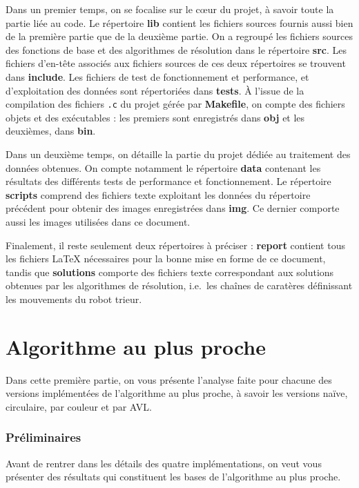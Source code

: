 \documentclass[12pt,a4paper]{article}
\begin{document}
Dans un premier temps, on se focalise sur le c\oe ur du projet, \`a 
savoir toute la partie li\'ee au code. Le r\'epertoire {\bfseries lib} contient 
les fichiers sources fournis aussi bien de la premi\`ere partie que de la 
deuxi\`eme partie. On a regroup\'e les fichiers sources des fonctions de base 
et des algorithmes de r\'esolution dans le r\'epertoire {\bfseries src}. Les 
fichiers d'en-t\^ete associ\'es aux fichiers sources de ces deux r\'epertoires 
se trouvent dans {\bfseries include}. Les fichiers de test de fonctionnement et 
performance, et d'exploitation des donn\'ees sont r\'epertori\'ees dans 
{\bfseries tests}. \`A l'issue de la compilation des fichiers \texttt{.c} du 
projet g\'er\'ee par {\bfseries Makefile}, on compte des fichiers objets et des 
ex\'ecutables : les premiers sont enregistr\'es dans {\bfseries obj} et les 
deuxi\`emes, dans {\bfseries bin}. 

Dans un deuxi\`eme temps, on d\'etaille la partie du projet d\'edi\'ee au 
traitement des donn\'ees obtenues. On compte notamment le r\'epertoire 
{\bfseries data} contenant les r\'esultats des diff\'erents tests de performance 
et fonctionnement. Le r\'epertoire {\bfseries scripts} comprend des fichiers 
texte exploitant les donn\'ees du r\'epertoire pr\'ec\'edent pour obtenir des 
images enregistr\'ees dans {\bfseries img}. Ce dernier comporte aussi les 
images utilis\'ees dans ce document.

Finalement, il reste seulement deux r\'epertoires \`a pr\'eciser : {\bfseries 
report} contient tous les fichiers \LaTeX{} n\'ecessaires pour la bonne mise en 
forme de ce document, tandis que {\bfseries solutions} comporte des fichiers 
texte correspondant aux solutions obtenues par les algorithmes de r\'esolution, 
i.e.\ les cha\^ines de carat\`eres d\'efinissant les mouvements du robot
 trieur.


\newpage

\part{Algorithme au plus proche}
Dans cette premi\`ere partie, on vous pr\'esente l'analyse faite pour chacune 
des versions impl\'ement\'ees de l'algorithme au plus proche, \`a savoir les 
versions na\"ive, circulaire, par couleur et par AVL.

\section{Pr\'eliminaires}
Avant de rentrer dans les d\'etails des quatre impl\'ementations, on 
veut vous pr\'esenter des r\'esultats qui constituent les bases de 
l'algorithme au plus proche.
\end{document}
